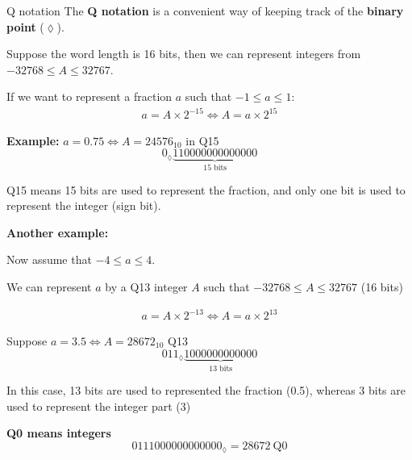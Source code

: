 \documentclass[10pt]{beamer}
\begin{document}
%
\begin{frame}{Q notation}
	The \textbf{Q notation} is a convenient way of keeping track of the \textbf{binary point} ($\lozenge$).
	
	Suppose the word length is 16 bits, then we can represent integers from $-32768 \leq A \leq 32767$.
		
	If we want to represent a fraction $a$ such that $-1\leq a\leq 1$:
	\begin{align*}
	a = A\times 2^{-15} \Longleftrightarrow A = a\times 2^{15}
	\end{align*}
		
	\textbf{Example:}
	$a =  0.75 \Longleftrightarrow A = 24576_{10}$ in Q15
	\begin{equation*}
	0_\lozenge\underbrace{110000000000000}_{\text{15 bits}}
	\end{equation*}
		
	Q15 means 15 bits are used to represent the fraction, and only one bit is used to represent the integer (sign bit).
\end{frame}

%
\begin{frame}
	
	\textbf{Another example:}
	
	Now assume that $-4\leq a\leq 4$. 
	
	We can represent $a$ by a Q13 integer $A$ such that $-32768 \leq A \leq 32767$ (16 bits)
	
	\begin{align*}
	a = A\times 2^{-13} \Longleftrightarrow A = a\times 2^{13}
	\end{align*}
	
	Suppose $a =  3.5 \Longleftrightarrow A = 28672_{10}$ Q13
	\begin{equation*}
	011_\lozenge\underbrace{1000000000000}_{\text{13 bits}}
	\end{equation*}
	
	In this case, 13 bits are used to represented the fraction (0.5), whereas 3 bits are used to represent the integer part (3)
	
	\textbf{Q0 means integers}
	\begin{equation*}
	0111000000000000_\lozenge = 28672~\text{Q0}
	\end{equation*}
\end{frame}
\end{document}
